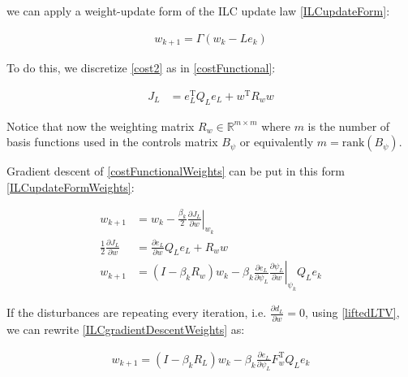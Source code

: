 \documentclass[10pt,a4paper]{article}
\newcommand\at[2]{\left.#1\right|_{#2}} %
\newcommand{\error}{e} %
\newcommand{\linDist}{d} %
\newcommand{\fullvec}{\psi} %
\newcommand{\weights}{w} %
\newcommand{\qmatrix}{\Gamma} %
\newcommand{\lmatrix}{L} %
\newcommand{\ValueFunction}{J}
\begin{document}
we can apply a weight-update form of the ILC update law \eqref{ILCupdateForm}:

\begin{equation}
\begin{aligned}
\weights_{k+1} = \qmatrix(\weights_{k} - \lmatrix\error_{k})
\end{aligned}
\label{ILCupdateFormWeights}
\end{equation}

To do this, we discretize \eqref{cost2} as in \eqref{costFunctional}:

\begin{equation}
\begin{aligned}
\ValueFunction_L &= \error_L^{\mathrm{T}}Q_L\error_L + \weights^{\mathrm{T}}R_w\weights
\end{aligned}
\label{costFunctionalWeights}
\end{equation}

Notice that now the weighting matrix $R_w \in \mathbb{R}^{m \times m}$ where $m$ is the number of basis functions used in the controls matrix $B_{\fullvec}$ or equivalently $m = \text{rank}(B_{\fullvec})$.

Gradient descent of \eqref{costFunctionalWeights} can be put in this form \eqref{ILCupdateFormWeights}:

\begin{equation}
\begin{aligned}
\weights_{k+1} &= \weights_k - \frac{\beta_k}{2} \at{\frac{\partial{\ValueFunction_L}}{\partial{\weights}}}{\weights_k} \\
\frac{1}{2}\frac{\partial{\ValueFunction_L}}{\partial{\weights}} &= \frac{\partial{\error_L}}{\partial{\weights}}Q_L\error_L + R_{\weights}\weights \\
\weights_{k+1} &= (I - \beta_kR_{\weights})\weights_k - \beta_k\frac{\partial{\error_L}}{\partial{\fullvec_L}}\at{\frac{\partial{\fullvec_L}}{\partial{\weights}}}{\fullvec_k}Q_L\error_k
\end{aligned}
\label{ILCgradientDescentWeights}
\end{equation}

If the disturbances are repeating every iteration, i.e. $\frac{\partial{\linDist_L}}{\partial{\weights}} = 0$, using \eqref{liftedLTV}, we can rewrite \eqref{ILCgradientDescentWeights} as:

\begin{equation}
\begin{aligned}
\weights_{k+1} = (I - \beta_kR_L)\weights_k - \beta_k\frac{\partial{\error_L}}{\partial{\fullvec_L}}F_{\weights}^\mathrm{T}Q_L\error_k
\end{aligned}
\label{ILCgradientDescentWeights2}
\end{equation}
\end{document}
